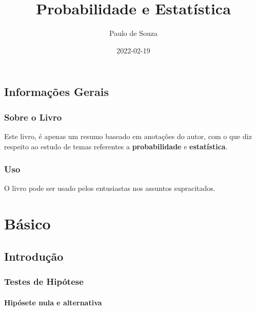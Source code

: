 \documentclass[
]{book}
\title{Probabilidade e Estatística}
\author{Paulo de Souza}
\date{2022-02-19}
\begin{document}
\maketitle

{
\setcounter{tocdepth}{1}
\tableofcontents
}
\hypertarget{informauxe7uxf5es-gerais}{%
\chapter*{Informações Gerais}\label{informauxe7uxf5es-gerais}}

\hypertarget{sobre-o-livro}{%
\section*{Sobre o Livro}\label{sobre-o-livro}}

Este livro, é apenas um resumo baseado em anotações do autor, com o que diz respeito ao estudo de temas referentes a \textbf{probabilidade} e \textbf{estatística}.

\hypertarget{uso}{%
\section*{Uso}\label{uso}}

O livro pode ser usado pelos entusiastas nos assuntos supracitados.

\hypertarget{part-buxe1sico}{%
\part{Básico}\label{part-buxe1sico}}

\hypertarget{introduuxe7uxe3o}{%
\chapter{Introdução}\label{introduuxe7uxe3o}}

\hypertarget{testes-de-hipuxf3tese}{%
\section{Testes de Hipótese}\label{testes-de-hipuxf3tese}}

\hypertarget{hipuxf3sete-nula-e-alternativa}{%
\subsection{Hipósete nula e alternativa}\label{hipuxf3sete-nula-e-alternativa}}
\end{document}
